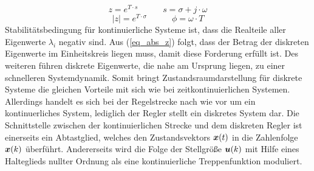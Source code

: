 \begin{equation}
z = e^{T\cdot s} \hspace{35pt} s = \sigma + j\cdot \omega
\end{equation}
\begin{equation}
\vert z \vert = e^{T\cdot \sigma} \hspace{35pt} \phi = \omega\cdot T
\label{eq_abs_z}
\end{equation}
Stabilitätsbedingung für kontinuierliche Systeme ist, dass die Realteile aller Eigenwerte $\lambda_i$ negativ sind. Aus (\ref{eq_abs_z}) folgt, dass der Betrag der diskreten Eigenwerte im Einheitskreis liegen muss, damit diese Forderung erfüllt ist. Des weiteren führen diskrete Eigenwerte, die nahe am Ursprung liegen, zu einer schnelleren Systemdynamik. Somit bringt Zustandsraumdarstellung für diskrete Systeme die gleichen Vorteile mit sich wie bei zeitkontinuierlichen Systemen.
Allerdings handelt es sich bei der Regelstrecke nach wie vor um ein kontinuerliches System, lediglich der Regler stellt ein diskretes System dar. Die Schnittstelle zwischen der kontinuierlichen Strecke und dem diskreten Regler ist einerseits ein Abtastglied, welches den Zustandsvektors $\boldsymbol{x}(t)$ in die Zahlenfolge $\boldsymbol{x}(k)$ überführt. Andererseits wird die Folge der Stellgröße $\boldsymbol{u}(k)$ mit Hilfe eines Halteglieds nullter Ordnung als eine kontinuierliche Treppenfunktion moduliert.

